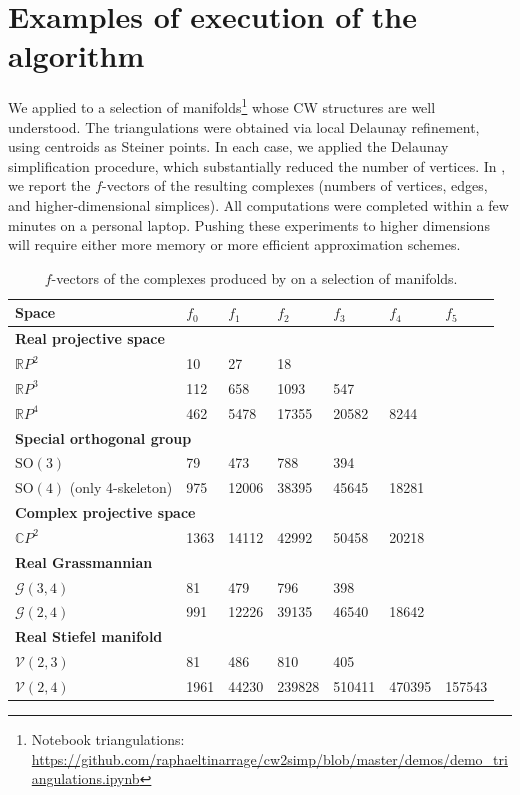 \documentclass[a4paper,english,cleveref,autoref,thm-restate,nolineno]{socg-lipics-v2021}
\newcommand{\C}{\mathbb C}
\newcommand{\R}{\mathbb R}
\newcommand{\GG}{\mathcal G} %
\newcommand{\VV}{\mathcal V} %
\begin{document}
\section{Examples of execution of the algorithm}
\label{sec:execution}

We applied  to a selection of manifolds\footnote{Notebook triangulations: \url{https://github.com/raphaeltinarrage/cw2simp/blob/master/demos/demo_triangulations.ipynb}} whose CW structures are well understood.
The triangulations were obtained via local Delaunay refinement, using centroids as Steiner points.
In each case, we applied the Delaunay simplification procedure, which substantially reduced the number of vertices.
In , we report the $f$-vectors of the resulting complexes (numbers of vertices, edges, and higher-dimensional simplices).
All computations were completed within a few minutes on a personal laptop.
Pushing these experiments to higher dimensions will require either more memory or more efficient approximation schemes.

\begin{table}[ht]
	\centering
	\begin{tabular}{p{.3\linewidth}llllll}
		\hline
		\textbf{Space}                    
		& \textbf{$f_0$}
		& \textbf{$f_1$}
		& \textbf{$f_2$}
		& \textbf{$f_3$}
		& \textbf{$f_4$}
		& \textbf{$f_5$}
		\\
		\hline
		\multicolumn{7}{l}{\textbf{Real projective space} }
		\\
		$\R P^2$
		& 10
		& 27
		& 18
		& 
		& 
		& 
		\\
		$\R P^3$
		& 112
		& 658
		& 1093
		& 547
		& 
		& 
		\\
		$\R P^4$
		& 462
		& 5478
		& 17355
		& 20582
		& 8244
		& 
		\\
		\multicolumn{7}{l}{\textbf{Special orthogonal group} } 
		\\
		$\mathrm{SO}(3)$
		& 79
		& 473
		& 788
		& 394
		& 
		& 
		\\
		$\mathrm{SO}(4)$ (only 4-skeleton)
		& 975
		& 12006
		& 38395
		& 45645
		& 18281
		& 
		\\
		\multicolumn{7}{l}{\textbf{Complex projective space} } 
		\\
		$\C P^2$
		& 1363 
		& 14112
		& 42992
		& 50458
		& 20218
		& 
		\\
		\multicolumn{7}{l}{\textbf{Real Grassmannian} } 
		\\
		$\GG(3,4)$
		& 81
		& 479
		& 796
		& 398
		& 
		& 
		\\
		$\GG(2,4)$
		& 991
		& 12226
		& 39135
		& 46540
		& 18642
		& 
		\\
		\multicolumn{7}{l}{\textbf{Real Stiefel manifold} } 
		\\
		$\VV(2,3)$
		& 81
		& 486
		& 810
		& 405
		& 
		& 
		\\
		$\VV(2,4)$
		& 1961
		& 44230
		& 239828
		& 510411
		& 470395
		& 157543
		\\
		\hline
	\end{tabular}
	\caption{
		$f$-vectors of the complexes produced by  on a selection of manifolds.
	}
	\label{tab:outputs}
\end{table}
\end{document}
